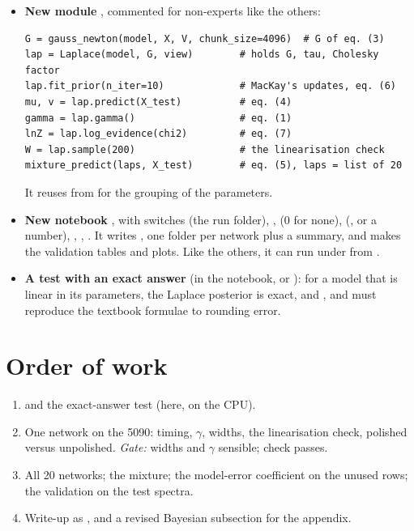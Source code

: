 \begin{itemize}
  \item \textbf{New module }, commented for non-experts like the
    others:
\begin{lstlisting}
G = gauss_newton(model, X, V, chunk_size=4096)  # G of eq. (3)
lap = Laplace(model, G, view)        # holds G, tau, Cholesky factor
lap.fit_prior(n_iter=10)             # MacKay's updates, eq. (6)
mu, v = lap.predict(X_test)          # eq. (4)
gamma = lap.gamma()                  # eq. (1)
lnZ = lap.log_evidence(chi2)         # eq. (7)
W = lap.sample(200)                  # the linearisation check
mixture_predict(laps, X_test)        # eq. (5), laps = list of 20
\end{lstlisting}
    It reuses  from  for the grouping of the parameters.
  \item \textbf{New notebook }, with switches 
    (the run folder), ,  (0 for none), 
    (,  or a number), ,
    , . It writes , one
    folder per network plus a summary, and makes the validation tables and plots. Like the
    others, it can run under  from .
  \item \textbf{A test with an exact answer} (in the notebook, or ):
    for a model that is linear in its parameters, the Laplace posterior is exact, and
    ,  and  must reproduce the textbook
    formulae to rounding error.
\end{itemize}

\section{Order of work}

\begin{enumerate}
  \item {} and the exact-answer test (here, on the CPU).
  \item One network on the 5090: timing, $\gamma$, widths, the linearisation check, polished
    versus unpolished. \emph{Gate:} widths and $\gamma$ sensible; check passes.
  \item All 20 networks; the mixture; the model-error coefficient on the unused rows; the
    validation on the test spectra.
  \item Write-up as , and a revised Bayesian subsection for
    the appendix.
\end{enumerate}

